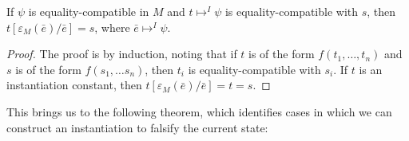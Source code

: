 \documentclass{llncs}
\begin{document}
\begin{lemma}
If $\psi$ is equality-compatible in $M$ and $t \mapsto^I \psi$ is equality-compatible with $s$, then $t[\varepsilon_M( \bar{e} )/\bar{e}] = s$, where $\bar{e} \mapsto^I \psi$.
\end{lemma}
\begin{proof}
The proof is by induction, noting that if $t$ is of the form $f( t_1, \ldots, t_n )$ and $s$ is of the form $f( s_1, \ldots s_n )$, then $t_i$ is equality-compatible with $s_i$.
If $t$ is an instantiation constant, then $t[\varepsilon_M(\bar{e})/\bar{e}] = t = s$.
\end{proof}

This brings us to the following theorem, which identifies cases in which we can construct an instantiation to falsify the current state:
\end{document}
